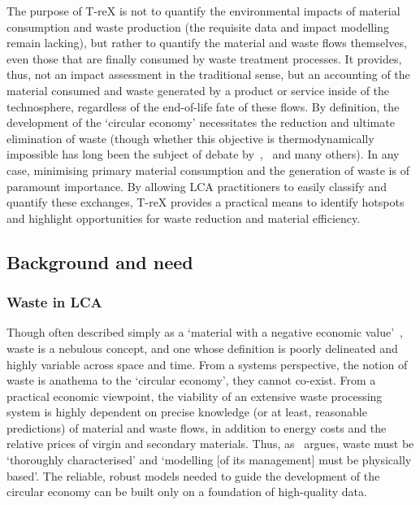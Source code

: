 The purpose of T-reX is not to quantify the environmental impacts of material consumption and waste production (the requisite data and impact modelling remain lacking), but rather to quantify the material and waste flows themselves, even those that are finally consumed by waste treatment processes. It provides, thus, not an impact assessment in the traditional sense, but an accounting of the material consumed and waste generated by a product or service inside of the technosphere, regardless of the end-of-life fate of these flows. By definition, the development of the `circular economy' necessitates the reduction and ultimate elimination of waste (though whether this objective is thermodynamically impossible has long been the subject of debate by~\cite{ayres1998recycling},~\cite{reuter2012recyclinglimits} and many others). In any case, minimising primary material consumption and the generation of waste is of paramount importance. By allowing LCA practitioners to easily classify and quantify these exchanges, T-reX provides a practical means to identify hotspots and highlight opportunities for waste reduction and material efficiency.

\subsection{Background and need}\label{sec:intro-background}
\subsubsection{Waste in LCA}\label{sec:intro-waste}

Though often described simply as a `material with a negative economic value'~\citep{guinee2004economicallocation}, waste is a nebulous concept, and one whose definition is poorly delineated and highly variable across space and time. From a systems perspective, the notion of waste is anathema to the `circular economy', they cannot co-exist. From a practical economic viewpoint, the viability of an extensive waste processing system is highly dependent on precise knowledge (or at least, reasonable predictions) of material and waste flows, in addition to energy costs and the relative prices of virgin and secondary materials. Thus, as~\cite{bisinella2024wastelca} argues, waste must be `thoroughly characterised' and `modelling [of its management] must be physically based'. The reliable, robust models needed to guide the development of the circular economy can be built only on a foundation of high-quality data.

